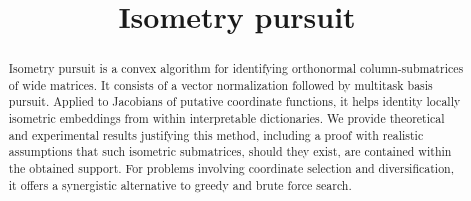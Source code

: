 \documentclass{article}
\title{Isometry pursuit}
\begin{document}
\maketitle

\begin{abstract}
Isometry pursuit is a convex algorithm for identifying orthonormal column-submatrices of wide matrices.
It consists of a vector normalization followed by multitask basis pursuit.
Applied to Jacobians of putative coordinate functions, it helps identity locally isometric embeddings from within interpretable dictionaries.
We provide theoretical and experimental results justifying this method, including a proof with realistic assumptions that such isometric submatrices, should they exist, are contained within the obtained support.
For problems involving coordinate selection and diversification, it offers a synergistic alternative to greedy and brute force search.
\end{abstract}








\newpage



\newpage



\newpage


\end{document}

